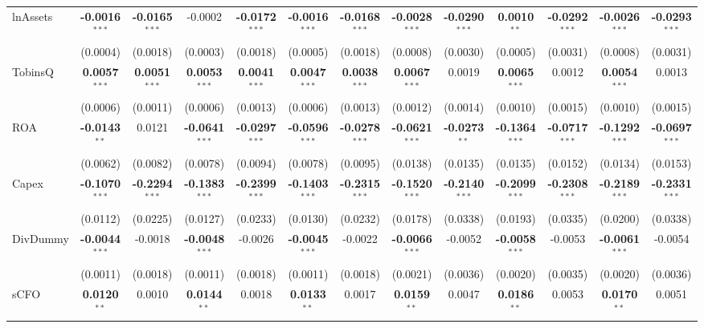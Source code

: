 \documentclass[11pt,a4paper]{article}
\begin{document}
\begin{table}[htbp]
\begin{tabular}{lcccccccccccc}
lnAssets & \textbf{-0.0016}$^{***}$ & \textbf{-0.0165}$^{***}$ & -0.0002 & \textbf{-0.0172}$^{***}$ & \textbf{-0.0016}$^{***}$ & \textbf{-0.0168}$^{***}$ & \textbf{-0.0028}$^{***}$ & \textbf{-0.0290}$^{***}$ & \textbf{0.0010}$^{**}$ & \textbf{-0.0292}$^{***}$ & \textbf{-0.0026}$^{***}$ & \textbf{-0.0293}$^{***}$ \\
 & (0.0004) & (0.0018) & (0.0003) & (0.0018) & (0.0005) & (0.0018) & (0.0008) & (0.0030) & (0.0005) & (0.0031) & (0.0008) & (0.0031) \\
TobinsQ & \textbf{0.0057}$^{***}$ & \textbf{0.0051}$^{***}$ & \textbf{0.0053}$^{***}$ & \textbf{0.0041}$^{***}$ & \textbf{0.0047}$^{***}$ & \textbf{0.0038}$^{***}$ & \textbf{0.0067}$^{***}$ & 0.0019 & \textbf{0.0065}$^{***}$ & 0.0012 & \textbf{0.0054}$^{***}$ & 0.0013 \\
 & (0.0006) & (0.0011) & (0.0006) & (0.0013) & (0.0006) & (0.0013) & (0.0012) & (0.0014) & (0.0010) & (0.0015) & (0.0010) & (0.0015) \\
ROA & \textbf{-0.0143}$^{**}$ & 0.0121 & \textbf{-0.0641}$^{***}$ & \textbf{-0.0297}$^{***}$ & \textbf{-0.0596}$^{***}$ & \textbf{-0.0278}$^{***}$ & \textbf{-0.0621}$^{***}$ & \textbf{-0.0273}$^{**}$ & \textbf{-0.1364}$^{***}$ & \textbf{-0.0717}$^{***}$ & \textbf{-0.1292}$^{***}$ & \textbf{-0.0697}$^{***}$ \\
 & (0.0062) & (0.0082) & (0.0078) & (0.0094) & (0.0078) & (0.0095) & (0.0138) & (0.0135) & (0.0135) & (0.0152) & (0.0134) & (0.0153) \\
Capex & \textbf{-0.1070}$^{***}$ & \textbf{-0.2294}$^{***}$ & \textbf{-0.1383}$^{***}$ & \textbf{-0.2399}$^{***}$ & \textbf{-0.1403}$^{***}$ & \textbf{-0.2315}$^{***}$ & \textbf{-0.1520}$^{***}$ & \textbf{-0.2140}$^{***}$ & \textbf{-0.2099}$^{***}$ & \textbf{-0.2308}$^{***}$ & \textbf{-0.2189}$^{***}$ & \textbf{-0.2331}$^{***}$ \\
 & (0.0112) & (0.0225) & (0.0127) & (0.0233) & (0.0130) & (0.0232) & (0.0178) & (0.0338) & (0.0193) & (0.0335) & (0.0200) & (0.0338) \\
DivDummy & \textbf{-0.0044}$^{***}$ & -0.0018 & \textbf{-0.0048}$^{***}$ & -0.0026 & \textbf{-0.0045}$^{***}$ & -0.0022 & \textbf{-0.0066}$^{***}$ & -0.0052 & \textbf{-0.0058}$^{***}$ & -0.0053 & \textbf{-0.0061}$^{***}$ & -0.0054 \\
 & (0.0011) & (0.0018) & (0.0011) & (0.0018) & (0.0011) & (0.0018) & (0.0021) & (0.0036) & (0.0020) & (0.0035) & (0.0020) & (0.0036) \\
sCFO & \textbf{0.0120}$^{**}$ & 0.0010 & \textbf{0.0144}$^{**}$ & 0.0018 & \textbf{0.0133}$^{**}$ & 0.0017 & \textbf{0.0159}$^{**}$ & 0.0047 & \textbf{0.0186}$^{**}$ & 0.0053 & \textbf{0.0170}$^{**}$ & 0.0051 \\

\end{tabular}
\end{table}
\end{document}
